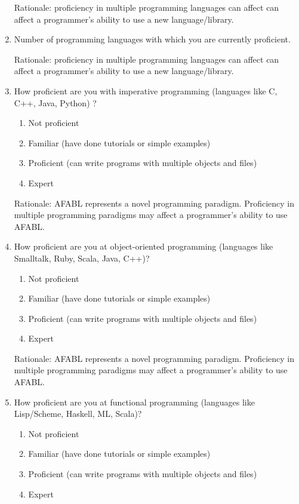 \begin{enumerate}
Rationale: proficiency in multiple programming languages can affect can affect a programmer’s ability to use a new language/library.

\item Number of programming languages with which you are currently proficient.

Rationale: proficiency in multiple programming languages can affect can affect a programmer’s ability to use a new language/library.

\item How proficient are you with imperative programming (languages like C, C++, Java, Python) ?
\begin{enumerate}
\item Not proficient
\item Familiar (have done tutorials or simple examples)
\item Proficient (can write programs with multiple objects and files)
\item Expert
\end{enumerate}

Rationale: AFABL represents a novel programming paradigm.  Proficiency in multiple programming paradigms may affect a programmer’s ability to use AFABL.

\item How proficient are you at object-oriented programming (languages like Smalltalk, Ruby, Scala, Java, C++)?  
\begin{enumerate}
\item Not proficient
\item Familiar (have done tutorials or simple examples)
\item Proficient (can write programs with multiple objects and files)
\item Expert
\end{enumerate}

Rationale: AFABL represents a novel programming paradigm.  Proficiency in multiple programming paradigms may affect a programmer’s ability to use AFABL.

\item How proficient are you at functional programming (languages like Lisp/Scheme, Haskell, ML, Scala)?  
\begin{enumerate}
\item Not proficient
\item Familiar (have done tutorials or simple examples)
\item Proficient (can write programs with multiple objects and files)
\item Expert
\end{enumerate}


\end{enumerate}
